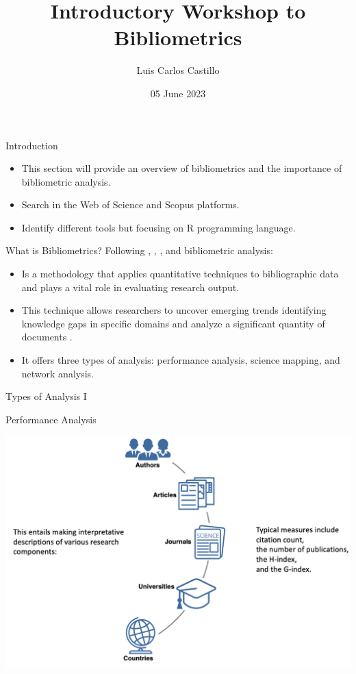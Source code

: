 \documentclass[
  ignorenonframetext,
]{beamer}
\title{Introductory Workshop to Bibliometrics}
\author{Luis Carlos Castillo}
\date{05 June 2023}
\institute{University of Urbino\\
Ph.D.~Program in Global Studies}
\providecommand{\tightlist}{%
  \setlength{\itemsep}{0pt}\setlength{\parskip}{0pt}}
\begin{document}
\frame{\titlepage}

\begin{frame}{Introduction}
\protect\hypertarget{introduction}{}
\begin{itemize}
\item
  This section will provide an overview of bibliometrics and the
  importance of bibliometric analysis.
\item
  Search in the Web of Science and Scopus platforms.
\item
  Identify different tools but focusing on R programming language.
\end{itemize}
\end{frame}

\begin{frame}{What is Bibliometrics?}
\protect\hypertarget{what-is-bibliometrics}{}
Following \citet{donthu2021}, \citet{ellegaard2015}, \citet{Aria2017},
and \citet{bornmann2015} bibliometric analysis:

\begin{itemize}
\tightlist
\item
  Is a methodology that applies quantitative techniques to bibliographic
  data and plays a vital role in evaluating research output.
\item
  This technique allows researchers to uncover emerging trends
  identifying knowledge gaps in specific domains and analyze a
  significant quantity of documents .
\item
  It offers three types of analysis: performance analysis, science
  mapping, and network analysis.
\end{itemize}
\end{frame}

\begin{frame}{Types of Analysis I}
\protect\hypertarget{types-of-analysis-i}{}
\begin{block}{Performance Analysis}
\protect\hypertarget{performance-analysis}{}
\begin{center}
\includegraphics[width=1\textwidth]{pic_1.png}
\end{center}
\end{block}
\end{frame}
\end{document}

